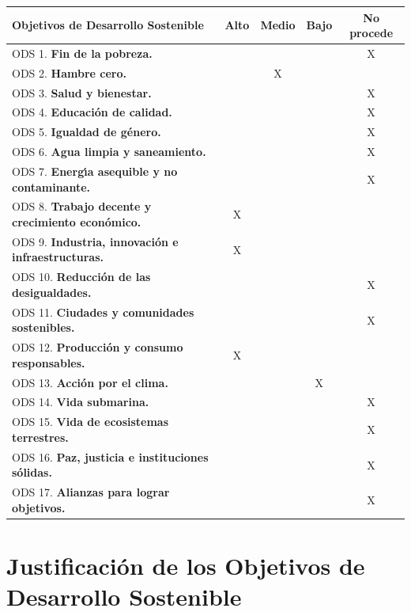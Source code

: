 \documentclass[11pt,spanish,listoffigures,listoftables]{tfgetsinf}
\begin{document}
\begin{tabularx}{\textwidth}{|>{\raggedright\arraybackslash}X|c|c|c|c|}\hline
   \textbf{Objetivos de Desarrollo Sostenible} & \textbf{Alto} & \textbf{Medio} & \textbf{Bajo} & \textbf{No procede} \\ \hline
   ODS 1.  \textbf{Fin de la pobreza.}                            & & & & X \\ \hline
   ODS 2.  \textbf{Hambre cero.}                                  & & X & & \\ \hline
   ODS 3.  \textbf{Salud y bienestar.}                            & & & & X\\ \hline
   ODS 4.  \textbf{Educaci\'on de calidad.}                       & & & & X \\ \hline
   ODS 5.  \textbf{Igualdad de g\'enero.}                         & & & & X \\ \hline
   ODS 6.  \textbf{Agua limpia y saneamiento.}                    & & & & X \\ \hline
   ODS 7.  \textbf{Energ\'{\i}a asequible y no contaminante.}     & & & & X\\ \hline
   ODS 8.  \textbf{Trabajo decente y crecimiento econ\'omico.}    & X & & & \\ \hline
   ODS 9.  \textbf{Industria, innovaci\'on e infraestructuras.}   & X & & & \\ \hline
   ODS 10. \textbf{Reducci\'on de las desigualdades.}             & & & & X\\ \hline
   ODS 11. \textbf{Ciudades y comunidades sostenibles.}           & & & & X\\ \hline
   ODS 12. \textbf{Producci\'on y consumo responsables.}          & X & & & \\ \hline
   ODS 13. \textbf{Acci\'on por el clima.}                        & & & X & \\ \hline
   ODS 14. \textbf{Vida submarina.}                               & & & & X \\ \hline
   ODS 15. \textbf{Vida de ecosistemas terrestres.}               & & & & X\\ \hline
   ODS 16. \textbf{Paz, justicia e instituciones s\'olidas.}      & & & & X\\ \hline
   ODS 17. \textbf{Alianzas para lograr objetivos.}               & & & & X\\ \hline
   \end{tabularx}


   \section*{Justificación de los Objetivos de Desarrollo Sostenible}
\end{document}
